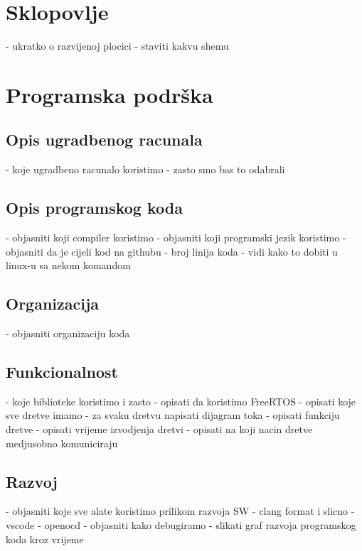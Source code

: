 \documentclass[times, utf8, diplomski, numeric]{templates/template}
\begin{document}
{    \section{Sklopovlje}{
        - ukratko o razvijenoj plocici
        - staviti kakvu shemu
    }

    \section{Programska podrška}{
        \subsection{Opis ugradbenog racunala}{
            - koje ugradbeno racunalo koristimo
            - zasto smo bas to odabrali
        }

        \subsection{Opis programskog koda}{
            - objasniti koji compiler koristimo
            - objasniti koji programski jezik koristimo
            - objasniti da je cijeli kod na githubu
            - broj linija koda
                - vidi kako to dobiti u linux-u sa nekom komandom
        }

        \subsection{Organizacija}{
            - objasniti organizaciju koda
        }

        \subsection{Funkcionalnost}{
            - koje biblioteke koristimo i zasto
            - opisati da koristimo FreeRTOS
            - opisati koje sve dretve imamo
                - za svaku dretvu napisati dijagram toka
                - opisati funkciju dretve
                - opisati vrijeme izvodjenja dretvi
                - opisati na koji nacin dretve medjusobno komuniciraju
        }

        \subsection{Razvoj}{
            - objasniti koje sve alate koristimo prilikom razvoja SW
                - clang format i slicno
                - vscode
                - openocd
            - objasniti kako debugiramo
            - slikati graf razvoja programskog koda kroz vrijeme
        }
    }
}
\end{document}
